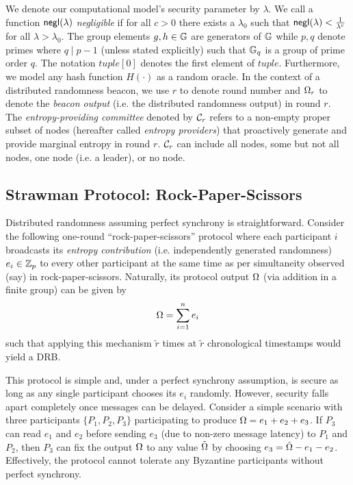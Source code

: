 We denote our computational model's security parameter by $\lambda$. We call a function $\mathsf{negl}(\lambda)$ \textit{negligible} if for all $c > 0$ there exists a $\lambda_0$ such that $\mathsf{negl}(\lambda) < \frac{1}{\lambda^c}$ for all $\lambda > \lambda_0$. The group elements $g, h \in \mathbb{G}$ are generators of $\mathbb{G}$ while $p, q$ denote primes where $q \mid p - 1$ (unless stated explicitly) such that $\mathbb{G}_q$ is a group of prime order $q$. The notation $tuple[0]$ denotes the first element of $tuple$. Furthermore, we model any hash function $H(\cdot)$ as a random oracle. In the context of a distributed randomness beacon, we use $r$ to denote round number and $\Omega_r$ to denote the \textit{beacon output} (i.e. the distributed randomness output) in round $r$. The \textit{entropy-providing committee} denoted by $\mathcal{C}_r$ refers to a non-empty proper subset of nodes (hereafter called \textit{entropy providers}) that proactively generate and provide marginal entropy in round $r$. $\mathcal{C}_r$ can include all nodes, some but not all nodes, one node (i.e. a leader), or no node.

\subsection{Strawman Protocol: Rock-Paper-Scissors}
Distributed randomness assuming perfect synchrony is straightforward. Consider the following one-round ``rock-paper-scissors'' protocol where each participant $i$ broadcasts its \textit{entropy contribution} (i.e. independently generated randomness) $e_i \in \mathbb{Z}_p$ to every other participant at the same time as per simultaneity observed (say) in rock-paper-scissors. Naturally, its protocol output $\Omega$ (via addition in a finite group) can be given by
\[
\Omega = \sum_{i = 1}^n e_i
\]
such that applying this mechanism $\tilde{r}$ times at $\tilde{r}$ chronological timestamps would yield a DRB.

This protocol is simple and, under a perfect synchrony assumption, is secure as long as any single participant chooses its $e_i$ randomly. However, security falls apart completely once messages can be delayed.
Consider a simple scenario with three participants $\{P_1, P_2, P_3\}$ participating to produce $\Omega = e_1 + e_2 + e_3$. If $P_3$ can read $e_1$ and $e_2$ before sending $e_3$ (due to non-zero message latency) to $P_1$ and $P_2$, then $P_3$ can fix the output $\Omega$ to any value $\tilde{\Omega}$ by choosing $e_3 = \tilde{\Omega} - e_1 - e_2$. Effectively, the protocol cannot tolerate any Byzantine participants without perfect synchrony.

